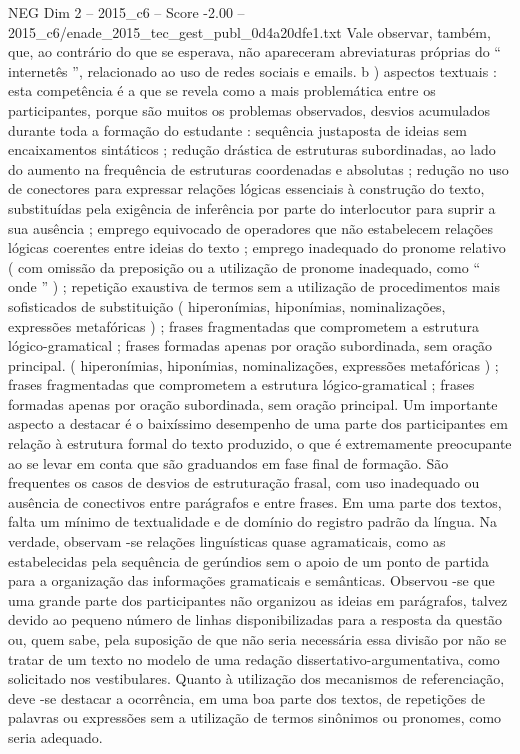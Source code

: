 \begin{textsample}{NEG Dim 2 – 2015\_c6 – Score -2.00 – 2015\_c6/enade\_2015\_tec\_gest\_publ\_0d4a20dfe1.txt}
Vale observar, também, que, ao contrário do que se esperava, não apareceram abreviaturas próprias do “ internetês ”, relacionado ao uso de redes sociais e emails. b ) aspectos textuais : esta competência é a que se revela como a mais problemática entre os participantes, porque são muitos os problemas observados, desvios acumulados durante toda a formação do estudante : sequência justaposta de ideias sem encaixamentos sintáticos ; redução drástica de estruturas subordinadas, ao lado do aumento na frequência de estruturas coordenadas e absolutas ; redução no uso de conectores para expressar relações lógicas essenciais à construção do texto, substituídas pela exigência de inferência por parte do interlocutor para suprir a sua ausência ; emprego equivocado de operadores que não estabelecem relações lógicas coerentes entre ideias do texto ; emprego inadequado do pronome relativo ( com omissão da preposição ou a utilização de pronome inadequado, como “ onde ” ) ; repetição exaustiva de termos sem a utilização de procedimentos mais sofisticados de substituição ( hiperonímias, hiponímias, nominalizações, expressões metafóricas ) ; frases fragmentadas que comprometem a estrutura lógico-gramatical ; frases formadas apenas por oração subordinada, sem oração principal. ( hiperonímias, hiponímias, nominalizações, expressões metafóricas ) ; frases fragmentadas que comprometem a estrutura lógico-gramatical ; frases formadas apenas por oração subordinada, sem oração principal.
Um importante aspecto a destacar é o baixíssimo desempenho de uma parte dos participantes em relação à estrutura formal do texto produzido, o que é extremamente preocupante ao se levar em conta que são graduandos em fase final de formação.
São frequentes os casos de desvios de estruturação frasal, com uso inadequado ou ausência de conectivos entre parágrafos e entre frases.
Em uma parte dos textos, falta um mínimo de textualidade e de domínio do registro padrão da língua.
Na verdade, observam -se relações linguísticas quase agramaticais, como as estabelecidas pela sequência de gerúndios sem o apoio de um ponto de partida para a organização das informações gramaticais e semânticas.
Observou -se que uma grande parte dos participantes não organizou as ideias em parágrafos, talvez devido ao pequeno número de linhas disponibilizadas para a resposta da questão ou, quem sabe, pela suposição de que não seria necessária essa divisão por não se tratar de um texto no modelo de uma redação dissertativo-argumentativa, como solicitado nos vestibulares.
Quanto à utilização dos mecanismos de referenciação, deve -se destacar a ocorrência, em uma boa parte dos textos, de repetições de palavras ou expressões sem a utilização de termos sinônimos ou pronomes, como seria adequado.

\end{textsample}
